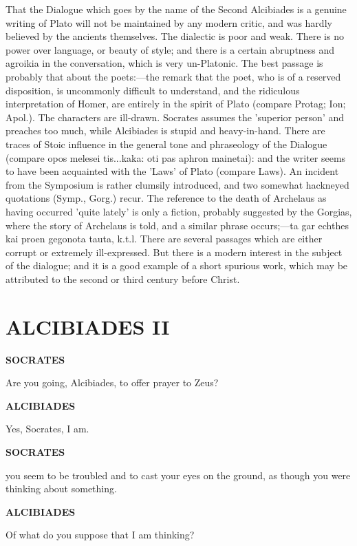 \documentclass[11pt,letter]{article}
\begin{document}
\par  That the Dialogue which goes by the name of the Second Alcibiades is a genuine writing of Plato will not be maintained by any modern critic, and was hardly believed by the ancients themselves. The dialectic is poor and weak. There is no power over language, or beauty of style; and there is a certain abruptness and agroikia in the conversation, which is very un-Platonic. The best passage is probably that about the poets:—the remark that the poet, who is of a reserved disposition, is uncommonly difficult to understand, and the ridiculous interpretation of Homer, are entirely in the spirit of Plato (compare Protag; Ion; Apol.). The characters are ill-drawn. Socrates assumes the 'superior person' and preaches too much, while Alcibiades is stupid and heavy-in-hand. There are traces of Stoic influence in the general tone and phraseology of the Dialogue (compare opos melesei tis...kaka: oti pas aphron mainetai): and the writer seems to have been acquainted with the 'Laws' of Plato (compare Laws). An incident from the Symposium is rather clumsily introduced, and two somewhat hackneyed quotations (Symp., Gorg.) recur. The reference to the death of Archelaus as having occurred 'quite lately' is only a fiction, probably suggested by the Gorgias, where the story of Archelaus is told, and a similar phrase occurs;—ta gar echthes kai proen gegonota tauta, k.t.l. There are several passages which are either corrupt or extremely ill-expressed. But there is a modern interest in the subject of the dialogue; and it is a good example of a short spurious work, which may be attributed to the second or third century before Christ.

\par 
\section{
      ALCIBIADES II
    } 
\par \textbf{SOCRATES}
\par   Are you going, Alcibiades, to offer prayer to Zeus?

\par \textbf{ALCIBIADES}
\par   Yes, Socrates, I am.

\par \textbf{SOCRATES}
\par   you seem to be troubled and to cast your eyes on the ground, as though you were thinking about something.

\par \textbf{ALCIBIADES}
\par   Of what do you suppose that I am thinking?
\end{document}
